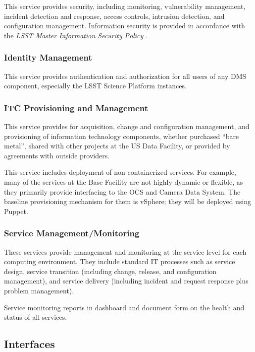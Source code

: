 \documentclass[DM,toc,lsstdraft]{lsstdoc}
\begin{document}
This service provides security, including monitoring, vulnerability management, incident detection and response, access controls, intrusion detection, and configuration management.
Information security is provided in accordance with the \textit{LSST Master Information Security Policy} .

\subsubsection{Identity Management}\label{identity-management}

This service provides authentication and authorization for all users of
any DMS component, especially the LSST Science Platform instances.

\subsubsection{ITC Provisioning and Management}\label{itc-provisioning-management}

This service provides for acquisition, change and configuration management, and provisioning of information technology components, whether purchased ``bare metal'', shared with other projects at the US Data Facility, or provided by agreements with outside providers.

This service includes deployment of non-containerized services.
For example, many of the services at the Base Facility are not highly dynamic or flexible, as they primarily provide interfacing to the OCS and Camera Data System.
The baseline provisioning mechanism for them is vSphere; they will be deployed using Puppet.

\subsubsection{Service Management/Monitoring}\label{service-management-monitoring}

These services provide management and monitoring at the service level for each computing environment.
They include standard IT processes such as service design, service transition (including change, release, and configuration management), and service delivery (including incident and request response plus problem management).

Service monitoring reports in dashboard and document form on the health and status of all services.

\subsection{Interfaces}\label{infrastructure-interfaces}
\end{document}
